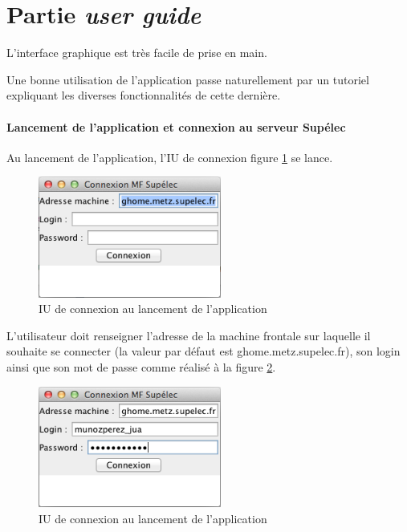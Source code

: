 \section{Partie \emph{user guide}}
\label{sec:user-guide}

\par L’interface graphique est très facile de prise en main.
\par Une bonne utilisation de l'application passe naturellement par un tutoriel expliquant les diverses fonctionnalités de cette dernière.

\paragraph{Lancement de l'application et connexion au serveur Supélec}
\label{sec:lancement_app}

\par Au lancement de l’application, l’IU de connexion figure \ref{fig:iucon_launch} se lance.

\begin{figure}[h!]
  \centering
  \includegraphics[width=6cm]{images/iuconnexion_launch.png}
  \caption{IU de connexion au lancement de l'application}
  \label{fig:iucon_launch}
\end{figure}

\par L’utilisateur doit renseigner l’adresse de la machine frontale sur laquelle il souhaite se connecter (la valeur par défaut est ghome.metz.supelec.fr), son login ainsi que son mot de passe comme réalisé à la figure \ref{fig:iucon_connect}.

\begin{figure}[h!]
  \centering
  \includegraphics[width=6cm]{images/iuconnexion_connect.png}
  \caption{IU de connexion au lancement de l'application}
  \label{fig:iucon_connect}
\end{figure}

